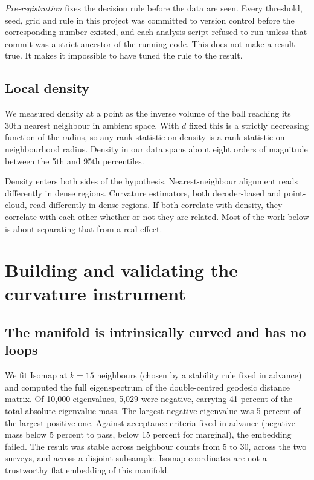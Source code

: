\documentclass[11pt,a4paper]{article}
\begin{document}
\emph{Pre-registration} fixes the decision rule before the data are seen. Every threshold, seed, grid and rule in this project was committed to version control before the corresponding number existed, and each analysis script refused to run unless that commit was a strict ancestor of the running code. This does not make a result true. It makes it impossible to have tuned the rule to the result.

\subsection{Local density}

We measured density at a point as the inverse volume of the ball reaching its 30th nearest neighbour in ambient space. With $d$ fixed this is a strictly decreasing function of the radius, so any rank statistic on density is a rank statistic on neighbourhood radius. Density in our data spans about eight orders of magnitude between the 5th and 95th percentiles.

Density enters both sides of the hypothesis. Nearest-neighbour alignment reads differently in dense regions. Curvature estimators, both decoder-based and point-cloud, read differently in dense regions. If both correlate with density, they correlate with each other whether or not they are related. Most of the work below is about separating that from a real effect.

\section{Building and validating the curvature instrument}

\subsection{The manifold is intrinsically curved and has no loops}

We fit Isomap at $k = 15$ neighbours (chosen by a stability rule fixed in advance) and computed the full eigenspectrum of the double-centred geodesic distance matrix. Of 10{,}000 eigenvalues, 5{,}029 were negative, carrying 41 percent of the total absolute eigenvalue mass. The largest negative eigenvalue was 5 percent of the largest positive one. Against acceptance criteria fixed in advance (negative mass below 5 percent to pass, below 15 percent for marginal), the embedding failed. The result was stable across neighbour counts from 5 to 30, across the two surveys, and across a disjoint subsample. Isomap coordinates are not a trustworthy flat embedding of this manifold.
\end{document}
